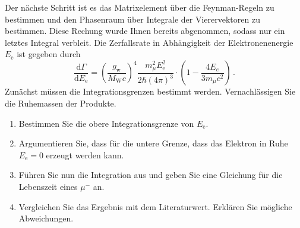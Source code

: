 \documentclass{exercise}
\begin{document}
Der nächste Schritt ist es das Matrixelement über die Feynman-Regeln zu bestimmen und den Phasenraum über Integrale der Vierervektoren zu bestimmen.
Diese Rechung wurde Ihnen bereits abgenommen, sodass nur ein letztes Integral verbleit. 
Die Zerfallsrate in Abhängigkeit der Elektronenenergie $E_\text{e}$ ist gegeben durch 
\begin{equation}
    \dfrac{\mathrm{d} \Gamma}{\mathrm{d} E_\text{e}} = \left(\dfrac{g_\text{w}}{M_\text{W}c}\right)^4 \dfrac{m_\mu^2 E^2_\text{e}}{2\hbar \left( 4 \pi\right)^3} \cdot \left(1 - \dfrac{4 E_e}{3 m_\mu c^2}\right) \,.
\end{equation}
Zunächst müssen die Integrationsgrenzen bestimmt werden. Vernachlässigen Sie die Ruhemassen der Produkte.
\begin{enumerate}[resume] 
    \item Bestimmen Sie die obere Integrationsgrenze von $E_\text{e}$. 
    \item Argumentieren Sie, dass für die untere Grenze, dass das Elektron in Ruhe $E_\text{e} = 0$ erzeugt werden kann.  

    \item Führen Sie nun die Integration aus und geben Sie eine Gleichung für die Lebenszeit eines $\mu^-$ an.

    \item Vergleichen Sie das Ergebnis mit dem Literaturwert. Erklären Sie mögliche Abweichungen.
\end{enumerate}
    
\end{document}
